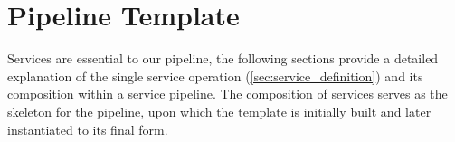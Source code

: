 \section{Pipeline Template}
Services are essential to our pipeline, the following sections provide a detailed explanation of the single service operation (\cref{sec:service_definition})  and its composition within a service pipeline.
The composition of services serves as the skeleton for the pipeline, upon which the template is initially built and later instantiated to its final form.


